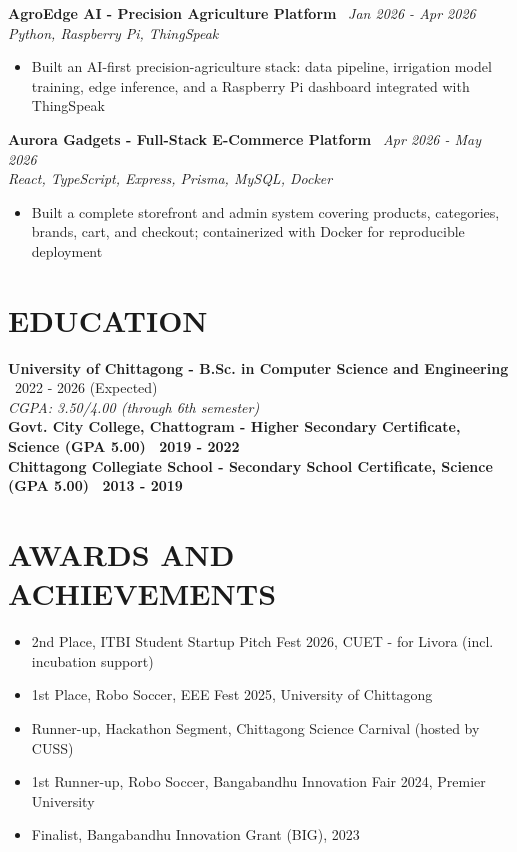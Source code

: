\documentclass[10.5pt,a4paper]{article}
\newenvironment{tightitemize}{
  \begin{itemize}[leftmargin=15pt, itemsep=1pt, parsep=0pt, topsep=2pt]
}{
  \end{itemize}
}
\newcommand{\entry}[3]{%
  \textbf{#1} \textbar\ #2\\
  \textit{#3}%
}
\newcommand{\entrysimple}[2]{%
  \textbf{#1} \textbar\ \textit{#2}\\[1pt]
}
\newcommand{\entrybold}[2]{%
  \textbf{#1 \textbar\ #2}%
}
\begin{document}
\entrysimple{AgroEdge AI - Precision Agriculture Platform}{Jan 2026 - Apr 2026}
\textit{Python, Raspberry Pi, ThingSpeak}
\begin{tightitemize}
  \item Built an AI-first precision-agriculture stack: data pipeline, irrigation model training, edge inference, and a Raspberry Pi dashboard integrated with ThingSpeak
\end{tightitemize}

\entrysimple{Aurora Gadgets - Full-Stack E-Commerce Platform}{Apr 2026 - May 2026}
\textit{React, TypeScript, Express, Prisma, MySQL, Docker}
\begin{tightitemize}
  \item Built a complete storefront and admin system covering products, categories, brands, cart, and checkout; containerized with Docker for reproducible deployment
\end{tightitemize}

\section*{EDUCATION}
\entry{University of Chittagong - B.Sc. in Computer Science and Engineering}{2022 - 2026 (Expected)}{CGPA: 3.50/4.00 (through 6th semester)}\\[4pt]
\entrybold{Govt. City College, Chattogram - Higher Secondary Certificate, Science (GPA 5.00)}{2019 - 2022}\\[2pt]
\entrybold{Chittagong Collegiate School - Secondary School Certificate, Science (GPA 5.00)}{2013 - 2019}

\section*{AWARDS AND ACHIEVEMENTS}
\begin{tightitemize}
  \item 2nd Place, ITBI Student Startup Pitch Fest 2026, CUET - for Livora (incl. incubation support)
  \item 1st Place, Robo Soccer, EEE Fest 2025, University of Chittagong
  \item Runner-up, Hackathon Segment, Chittagong Science Carnival (hosted by CUSS)
  \item 1st Runner-up, Robo Soccer, Bangabandhu Innovation Fair 2024, Premier University
  \item Finalist, Bangabandhu Innovation Grant (BIG), 2023
\end{tightitemize}
\end{document}
